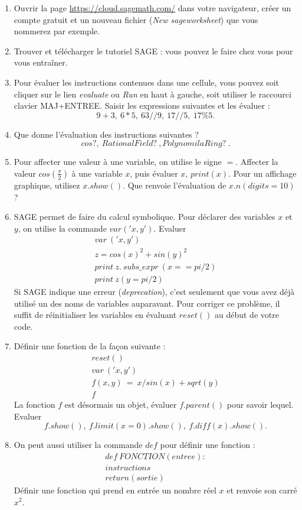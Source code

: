 \begin{enumerate}
\item Ouvrir la page \url{https://cloud.sagemath.com/} dans votre navigateur, créer un compte gratuit et un nouveau fichier (\textit{New sageworksheet}) que vous nommerez  par exemple.
\item Trouver et télécharger le tutoriel SAGE : vous pouvez le faire chez vous pour vous entraîner.
\item Pour évaluer les instructions contenues dans une cellule, vous pouvez soit cliquer sur le lien \textit{evaluate} ou \textit{Run} en haut à gauche, soit utiliser le raccourci clavier MAJ+ENTREE. Saisir les expressions suivantes et les évaluer :
\[9+3,\ 6*5,\ 63//9,\ 17//5,\ 17\%5.\]
\item Que donne l'évaluation des instructions suivantes ?
\[cos?,\ RationalField? \ , PolynomilaRing? \ .\] 
\item Pour affecter une valeur à une variable, on utilise le signe $=$. Affecter la valeur $cos(\frac{\pi}{2})$ à une variable $x$, puis évaluer $x$, $print(x)$. Pour un affichage graphique, utilisez $x.show()$. Que renvoie l'évaluation de $x.n(digits=10)$ ?
\item SAGE permet de faire du calcul symbolique. Pour déclarer des variables $x$ et $y$, on utilise la commande $var('x,y')$. Evaluer
\[\begin{array}{l}
var\ ('x,y') \\
z = cos (x )^2 + sin (y )^2 \\
print\ z.\ subs\_expr\ (x== pi /2)\\
print \ z(y=pi /2)
\end{array}\]
Si SAGE indique une erreur (\textit{deprecation}), c'est seulement que vous avez déjà utilisé un des noms de variables auparavant. Pour corriger ce problème, il suffit de réinitialiser les variables en évaluant $reset()$ au début de votre code.
\item Définir une fonction de la façon suivante :
\[\begin{array}{l}
reset ()\\
var\ ('x,y') \\
f(x,y) \ = \ x/ sin (x) + sqrt (y) \\
f
\end{array}\]
La fonction $f$ est désormais un objet, évaluer $f.parent()$ pour savoir lequel. Evaluer \[f. show (), \  f. limit (x =0). show (),\ f. diff (x). show ().\]
\item On peut aussi utiliser la commande $def$ pour définir une fonction : 
\[\begin{array}{l}
def\ FONCTION(entree):\\
instructions\\
return(sortie)
\end{array}
\]
Définir une fonction qui prend en entrée un nombre réel $x$ et renvoie son carré $x^2$.

\end{enumerate}
